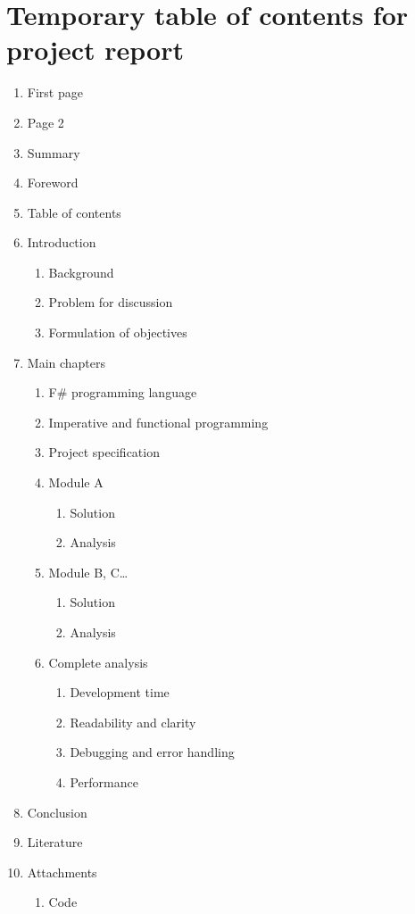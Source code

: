 \documentclass[12pt, a4paper]{article}
\begin{document}
\section{Temporary table of contents for project report}
\begin{enumerate}
	\item First page
	\item Page 2
	\item Summary
	\item Foreword
	\item Table of contents
	\item Introduction 
	\begin{enumerate}
		\item Background
		\item Problem for discussion
		\item Formulation of objectives
	\end{enumerate}
	\item Main chapters
	\begin{enumerate}
		\item F\# programming language
		\item Imperative and functional programming
		\item Project specification
		\item Module A
		\begin{enumerate}
			\item Solution
			\item Analysis
		\end{enumerate}
		\item Module B, C…
		\begin{enumerate}
			\item Solution
			\item Analysis
		\end{enumerate}
		\item Complete analysis
		\begin{enumerate}
			\item Development time
			\item Readability and clarity
			\item Debugging and error handling
			\item Performance
		\end{enumerate}
	\end{enumerate}
	\item Conclusion
	\item Literature
	\item Attachments
	\begin{enumerate}
		\item Code
	\end{enumerate}
\end{enumerate}
\end{document}
